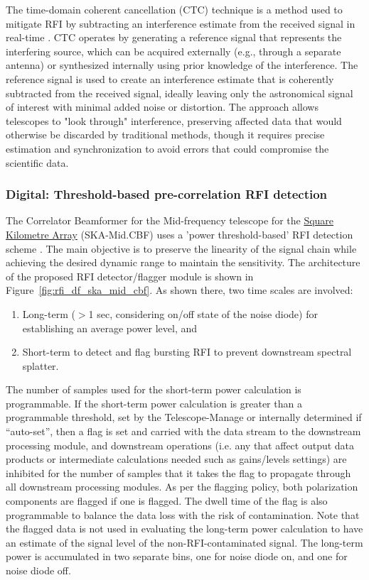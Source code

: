 The time-domain coherent cancellation (CTC) technique is a method used to mitigate RFI by subtracting an interference estimate from the received signal in real-time \citep{ellingson2022coherent}. CTC operates by generating a reference signal that represents the interfering source, which can be acquired externally (e.g., through a separate antenna) or synthesized internally using prior knowledge of the interference. The reference signal is used to create an interference estimate that is coherently subtracted from the received signal, ideally leaving only the astronomical signal of interest with minimal added noise or distortion. The approach allows telescopes to "look through" interference, preserving affected data that would otherwise be discarded by traditional methods, though it requires precise estimation and synchronization to avoid errors that could compromise the scientific data.

\subsubsection{Digital: Threshold-based pre-correlation RFI detection}
\label{subsection:hardware:catalog:ska-mid}

The Correlator Beamformer for the Mid-frequency telescope for the \href{https://www.skao.int/en}{Square Kilometre Array} (SKA-Mid.CBF) uses a 'power threshold-based' RFI detection scheme \citep{ska_mid_cbf_rfi_2019}. The main objective is to preserve the linearity of the signal chain while achieving the desired dynamic range to maintain the sensitivity. The architecture of the proposed RFI detector/flagger module is shown in Figure~\ref{fig:rfi_df_ska_mid_cbf}. As shown there, two time scales are involved:
\begin{enumerate}
    \item Long-term ($>$1 sec, considering on/off state of the noise diode) for establishing an average power level, and
    \item Short-term to detect and flag bursting RFI to prevent downstream spectral splatter.
\end{enumerate}

The number of samples used for the short-term power calculation is programmable. If the short-term power calculation is greater than a programmable threshold, set by the Telescope-Manage or internally determined if “auto-set”, then a flag is set and carried with the data stream to the downstream processing module, and downstream operations (i.e. any that affect output data products or intermediate calculations needed such as gains/levels settings) are inhibited for the number of samples that it takes the flag to propagate through all downstream processing modules. As per the flagging policy, both polarization components are flagged if one is flagged. The dwell time of the flag is also programmable to balance the data loss with the risk of contamination. Note that the flagged data is not used in evaluating the long-term power calculation to have an estimate of the signal level of the non-RFI-contaminated signal. The long-term power is accumulated in two separate bins, one for noise diode on, and one for noise diode off.


